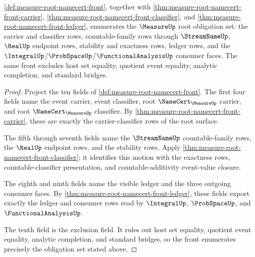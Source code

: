 \begin{theorem}
\label{thm:measure-root-namecert-front-obligation-status}
\autoref{def:measure-root-namecert-front}, together with
\autoref{thm:measure-root-namecert-front-carrier},
\autoref{thm:measure-root-namecert-front-classifier}, and
\autoref{thm:measure-root-namecert-front-ledger}, enumerates the
$\MeasureUp$ root obligation set: the carrier and classifier rows,
countable-family rows through $\StreamNameUp$, $\RealUp$ endpoint rows,
stability and exactness rows, ledger rows, and the
$\IntegralUp$/$\ProbSpaceUp$/$\FunctionalAnalysisUp$ consumer faces.  The
same front excludes host set equality, quotient event equality, analytic
completion, and standard bridges.
\end{theorem}
\begin{proof}
Project the ten fields of \autoref{def:measure-root-namecert-front}.  The
first four fields name the event carrier, event classifier, root
$\NameCert_{\MeasureUp}$ carrier, and root $\NameCert_{\MeasureUp}$
classifier.  By \autoref{thm:measure-root-namecert-front-carrier}, these are
exactly the carrier-classifier rows of the root surface.

The fifth through seventh fields name the $\StreamNameUp$ countable-family
rows, the $\RealUp$ endpoint rows, and the stability rows.  Apply
\autoref{thm:measure-root-namecert-front-classifier}; it identifies this
motion with the exactness rows, countable-classifier presentation, and
countable-additivity event-value closure.

The eighth and ninth fields name the visible ledger and the three outgoing
consumer faces.  By \autoref{thm:measure-root-namecert-front-ledger}, these
fields export exactly the ledger and consumer rows read by $\IntegralUp$,
$\ProbSpaceUp$, and $\FunctionalAnalysisUp$.

The tenth field is the exclusion field.  It rules out host set equality,
quotient event equality, analytic completion, and standard bridges, so the
front enumerates precisely the obligation set stated above.
\end{proof}
